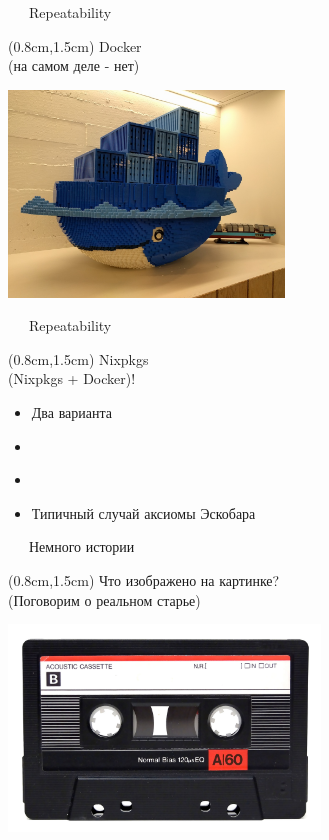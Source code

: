 \documentclass[xetex,18pt,aspectratio=43]{beamer}
\begin{document}
\begin{Large}
\begin{frame}{\ \ \ Repeatability}
\begin{textblock*}{\framewidth}(0.8cm,1.5cm)
Docker\\
{\small (на самом деле - нет)}
\begin{minipage}{\textwidth}
  \centering
  \includegraphics[height=5.5cm]{img/dockerlogo}
\end{minipage}
\end{textblock*}
\end{frame}

\begin{frame}{\ \ \ Repeatability}
\begin{textblock*}{\framewidth}(0.8cm,1.5cm)
Nixpkgs\\
{\small (Nixpkgs + Docker)!}
\begin{itemize}
  \item Два варианта
  \item \href{https://goo.gl/6uxL0M}{\color{blue}{https://goo.gl/6uxL0M}}
  \item \href{https://goo.gl/wkduPv}{\color{blue}{https://goo.gl/wkduPv}}
  \item Типичный случай аксиомы Эскобара
\end{itemize}
\end{textblock*}
\end{frame}

\begin{frame}{\ \ \ Немного истории}
\begin{textblock*}{\framewidth}(0.8cm,1.5cm)
Что изображено на картинке?\\
{\small (Поговорим о реальном старье)}
\begin{minipage}{\textwidth}
  \centering
  \includegraphics[height=5.5cm]{img/cassette}
\end{minipage}
\end{textblock*}
\end{frame}


\end{Large}
\end{document}
